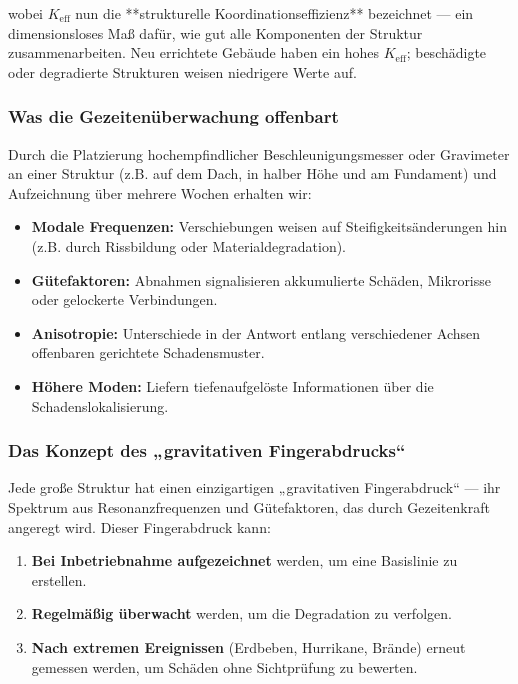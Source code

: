\documentclass[12pt,a4paper]{article}
\theoremstyle{remark}
\begin{document}
	wobei \(K_{\mathrm{eff}}\) nun die **strukturelle Koordinationseffizienz** bezeichnet — ein dimensionsloses Maß dafür, wie gut alle Komponenten der Struktur zusammenarbeiten. Neu errichtete Gebäude haben ein hohes \(K_{\mathrm{eff}}\); beschädigte oder degradierte Strukturen weisen niedrigere Werte auf.
	
	\subsubsection{Was die Gezeitenüberwachung offenbart}
	
	Durch die Platzierung hochempfindlicher Beschleunigungsmesser oder Gravimeter an einer Struktur (z.B. auf dem Dach, in halber Höhe und am Fundament) und Aufzeichnung über mehrere Wochen erhalten wir:
	
	\begin{itemize}
		\item \textbf{Modale Frequenzen:} Verschiebungen weisen auf Steifigkeitsänderungen hin (z.B. durch Rissbildung oder Materialdegradation).
		\item \textbf{Gütefaktoren:} Abnahmen signalisieren akkumulierte Schäden, Mikrorisse oder gelockerte Verbindungen.
		\item \textbf{Anisotropie:} Unterschiede in der Antwort entlang verschiedener Achsen offenbaren gerichtete Schadensmuster.
		\item \textbf{Höhere Moden:} Liefern tiefenaufgelöste Informationen über die Schadenslokalisierung.
	\end{itemize}
	
	\subsubsection{Das Konzept des „gravitativen Fingerabdrucks“}
	
	Jede große Struktur hat einen einzigartigen „gravitativen Fingerabdruck“ — ihr Spektrum aus Resonanzfrequenzen und Gütefaktoren, das durch Gezeitenkraft angeregt wird. Dieser Fingerabdruck kann:
	\begin{enumerate}
		\item \textbf{Bei Inbetriebnahme aufgezeichnet} werden, um eine Basislinie zu erstellen.
		\item \textbf{Regelmäßig überwacht} werden, um die Degradation zu verfolgen.
		\item \textbf{Nach extremen Ereignissen} (Erdbeben, Hurrikane, Brände) erneut gemessen werden, um Schäden ohne Sichtprüfung zu bewerten.
	\end{enumerate}
	
\end{document}
